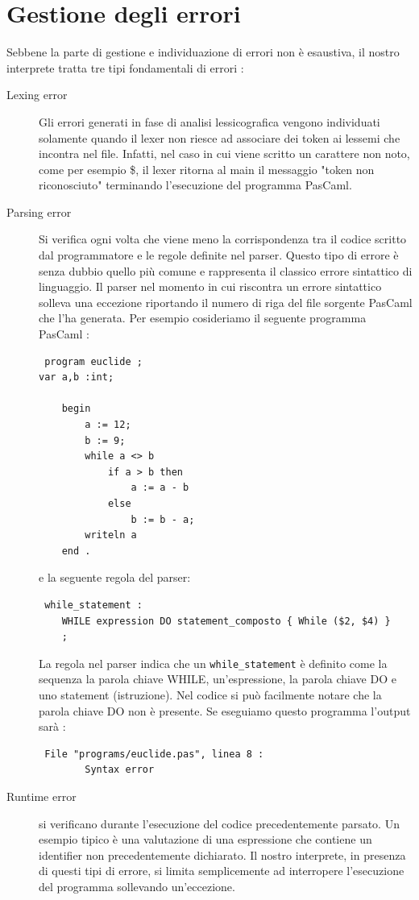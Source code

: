 \documentclass[a4paper,10pt]{article}
\begin{document}
\section{Gestione degli errori}
Sebbene la parte di gestione e individuazione di errori non \`e esaustiva, il
nostro interprete tratta tre tipi fondamentali di errori :
\begin{description}
 \item [Lexing error] Gli errori generati in fase di analisi lessicografica
vengono individuati solamente quando il lexer non riesce ad associare dei token
ai lessemi che incontra nel file. Infatti, nel caso in cui viene scritto un
carattere non noto, come per esempio \$, il lexer ritorna al main il messaggio
"token non riconosciuto" terminando l'esecuzione del programma PasCaml.
\item [Parsing error] Si verifica ogni volta che viene meno la corrispondenza
tra il codice scritto dal programmatore e le regole definite nel parser. Questo
tipo di errore \`e senza dubbio quello pi\`u comune e rappresenta il classico
errore sintattico di linguaggio. Il parser nel momento in cui riscontra un
errore sintattico solleva una eccezione riportando il numero di riga del file
sorgente PasCaml che l'ha generata. Per esempio cosideriamo il seguente
programma PasCaml :
\begin{verbatim}
 program euclide ;
var a,b :int;

    begin
        a := 12;
        b := 9;
        while a <> b
            if a > b then
                a := a - b
            else
                b := b - a;
        writeln a
    end .
\end{verbatim}
e la seguente regola del parser:
\begin{verbatim}
 while_statement :
    WHILE expression DO statement_composto { While ($2, $4) }
    ;
\end{verbatim}
La regola nel parser indica che un \verb|while_statement| \`e definito come la
sequenza 
la parola chiave WHILE, un'espressione, la parola chiave DO e uno statement
(istruzione). Nel codice si pu\`o facilmente notare che la parola chiave DO non
\`e presente. Se eseguiamo questo programma l'output sar\`a :
\begin{verbatim}
 File "programs/euclide.pas", linea 8 :
        Syntax error
\end{verbatim}
\item [Runtime error] si verificano durante l'esecuzione del codice
precedentemente parsato. Un esempio tipico \`e una valutazione di una
espressione che contiene un identifier non precedentemente dichiarato. Il nostro
interprete, in presenza di questi tipi di errore, si limita semplicemente ad
interropere l'esecuzione del programma sollevando un'eccezione.
\end{description}
\end{document}
